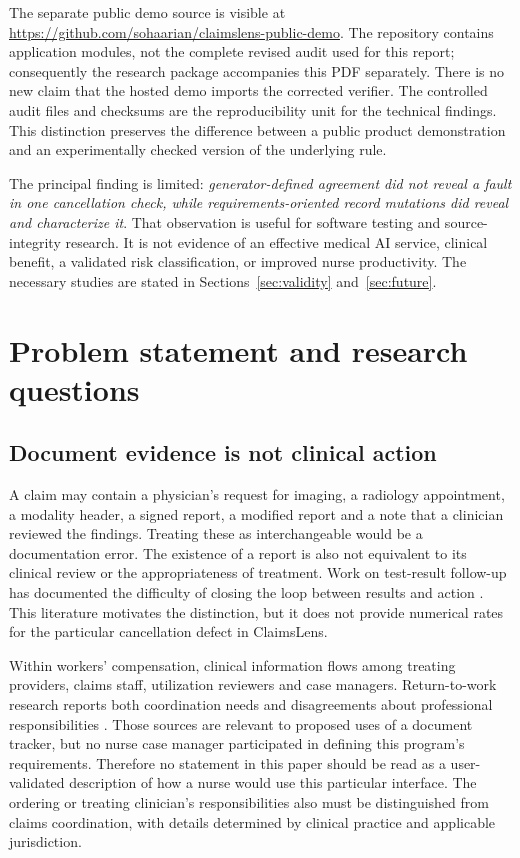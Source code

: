\documentclass[11pt,twocolumn]{article}
\begin{document}
The separate public demo source is visible at \url{https://github.com/sohaarian/claimslens-public-demo}. The repository contains application modules, not the complete revised audit used for this report; consequently the research package accompanies this PDF separately. There is no new claim that the hosted demo imports the corrected verifier. The controlled audit files and checksums are the reproducibility unit for the technical findings. This distinction preserves the difference between a public product demonstration and an experimentally checked version of the underlying rule.

The principal finding is limited: \emph{generator-defined agreement did not reveal a fault in one cancellation check, while requirements-oriented record mutations did reveal and characterize it}. That observation is useful for software testing and source-integrity research. It is not evidence of an effective medical AI service, clinical benefit, a validated risk classification, or improved nurse productivity. The necessary studies are stated in Sections~\ref{sec:validity} and~\ref{sec:future}.

\section{Problem statement and research questions}\label{sec:problem}
\subsection{Document evidence is not clinical action}
A claim may contain a physician's request for imaging, a radiology appointment, a modality header, a signed report, a modified report and a note that a clinician reviewed the findings. Treating these as interchangeable would be a documentation error. The existence of a report is also not equivalent to its clinical review or the appropriateness of treatment. Work on test-result follow-up has documented the difficulty of closing the loop between results and action \cite{callen2012,singh2009,singh2010}. This literature motivates the distinction, but it does not provide numerical rates for the particular cancellation defect in ClaimsLens.

Within workers' compensation, clinical information flows among treating providers, claims staff, utilization reviewers and case managers. Return-to-work research reports both coordination needs and disagreements about professional responsibilities \cite{russell2019,yanar2019,kosny2016}. Those sources are relevant to proposed uses of a document tracker, but no nurse case manager participated in defining this program's requirements. Therefore no statement in this paper should be read as a user-validated description of how a nurse would use this particular interface. The ordering or treating clinician's responsibilities also must be distinguished from claims coordination, with details determined by clinical practice and applicable jurisdiction.
\end{document}
